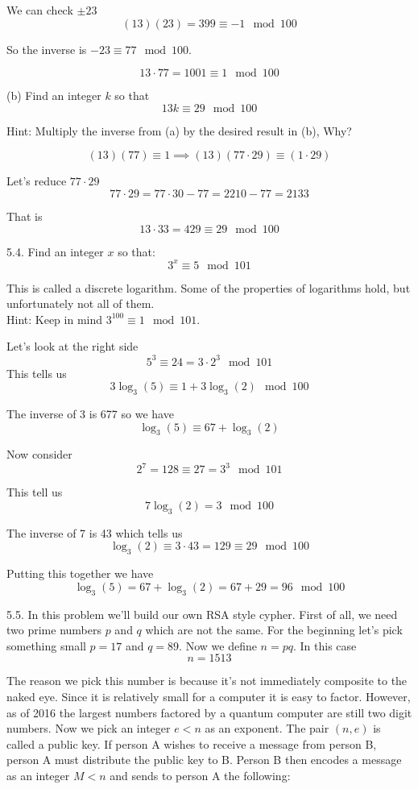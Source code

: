 \documentclass[16 pt]{amsart}
\theoremstyle{definition}
\theoremstyle{remark}
\numberwithin{equation}{subsection}
\begin{document}
We can check $\pm 23$
\[
(13)(23) = 399 \equiv -1 \mod 100
\]

So the inverse is $-23 \equiv 77 \mod 100$.

\[
13\cdot 77 = 1001 \equiv 1 \mod 100
\]



(b) Find an integer $k$ so that 
\[
13k \equiv 29 \mod{100}
\]

Hint: Multiply the inverse from (a) by the desired result in (b), Why?

\[
(13)(77) \equiv 1 \implies (13)(77\cdot 29) \equiv (1\cdot 29)
\]

Let's reduce $77\cdot 29$ 
\[
77\cdot 29 = 77\cdot 30 - 77 = 2210 - 77 = 2133
\]

That is 
\[
13\cdot 33 = 429 \equiv 29 \mod 100
\]




5.4. Find an integer $x$ so that:
\[
3^x \equiv 5 \mod{101}
\]

This is called a discrete logarithm.  Some of the properties of logarithms hold, but unfortunately not all of them.\\
Hint:  Keep in mind $3^{100}\equiv 1\mod{101}$.


Let's look at the right side
\[
5^3 \equiv 24 = 3\cdot 2^3 \mod 101
\]
This tells us
\[
3\log_3(5) \equiv 1 + 3\log_3(2) \mod 100
\]

The inverse of 3 is 677 so we have
\[
\log_3(5) \equiv 67 + \log_3(2)
\]

Now consider
\[
2^7 = 128 \equiv 27 = 3^3 \mod 101
\]

This tell us
\[
7\log_3(2) = 3 \mod 100
\]

The inverse of 7 is 43 which tells us
\[
\log_3(2) \equiv 3\cdot 43 = 129 \equiv 29 \mod 100
\]

Putting this together we have
\[
\log_3(5) = 67 + \log_3(2) = 67+29 = 96 \mod 100
\]






5.5. In this problem we'll build our own RSA style cypher. First of all, we need two prime numbers $p$ and $q$ which are not the same.  For the beginning let's pick something small $p=17$ and $q=89$.  Now we define $n=pq$.  In this case
\[
n = 1513
\]  

The reason we pick this number is because it's not immediately composite to the naked eye.  Since it is relatively small for a computer it is easy to factor.  However, as of 2016 the largest numbers factored by a quantum computer are still two digit numbers.  Now we pick an integer $e<n$ as an exponent.  The pair $(n,e)$ is called a public key.  If person A wishes to receive a message from person B, person A must distribute the public key to B.  Person B then encodes a message as an integer $M<n$ and sends to person A the following:
\end{document}
